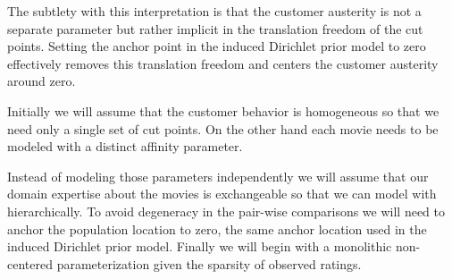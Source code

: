 \documentclass[
  letterpaper,
  DIV=11,
  numbers=noendperiod]{scrartcl}
\begin{document}
The subtlety with this interpretation is that the customer austerity is
not a separate parameter but rather implicit in the translation freedom
of the cut points. Setting the anchor point in the induced Dirichlet
prior model to zero effectively removes this translation freedom and
centers the customer austerity around zero.

Initially we will assume that the customer behavior is homogeneous so
that we need only a single set of cut points. On the other hand each
movie needs to be modeled with a distinct affinity parameter.

Instead of modeling those parameters independently we will assume that
our domain expertise about the movies is exchangeable so that we can
model with hierarchically. To avoid degeneracy in the pair-wise
comparisons we will need to anchor the population location to zero, the
same anchor location used in the induced Dirichlet prior model. Finally
we will begin with a monolithic non-centered parameterization given the
sparsity of observed ratings.
\end{document}
